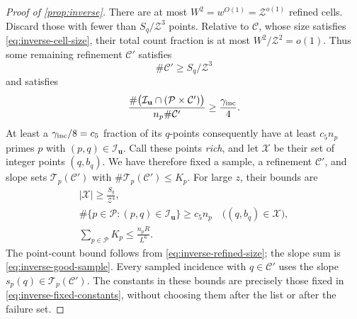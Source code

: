 \begin{proof}[Proof of \cref{prop:inverse}]
There are at most \(W^2=w^{O(1)}=\mathcal Z^{o(1)}\) refined cells.
Discard those with fewer than \(S_q/\mathcal Z^3\) points.
Relative to \(\mathcal C\), whose size satisfies
\eqref{eq:inverse-cell-size}, their total count fraction is at most
\(W^2/\mathcal Z^2=o(1)\).
Thus some remaining refinement \(\mathcal C'\) satisfies
\begin{equation}
 \#\mathcal C'\ge S_q/\mathcal Z^3
 \label{eq:inverse-refined-size}
\end{equation}
and satisfies
\[
 \frac{\#\bigl(\mathcal I_{\mathbf u}\cap
                 (\mathcal P\times\mathcal C')\bigr)}
      {n_p\#\mathcal C'}\ge\frac{\gamma_{\rm inc}}4.
\]
At least a \(\gamma_{\rm inc}/8=c_5\) fraction of its \(q\)-points consequently
have at least \(c_5 n_p\) primes \(p\) with
\((p,q)\in\mathcal I_{\mathbf u}\).
Call these points \emph{rich}, and let \(\mathcal X\) be their set of
integer points \((q,b_q)\). We have therefore fixed a sample, a refinement
\(\mathcal C'\), and slope sets \(\mathcal T_p(\mathcal C')\) with
\(\#\mathcal T_p(\mathcal C')\le K_p\). For large \(z\), their bounds are
\begin{equation}
\begin{gathered}
 |\mathcal X|\ge \frac{S_q}{\mathcal Z^4},\\
 \#\{p\in\mathcal P:(p,q)\in\mathcal I_{\mathbf u}\}\ge c_5n_p
       \quad\bigl((q,b_q)\in\mathcal X\bigr),\\
 \sum_{p\in\mathcal P}K_p\le\frac{n_pR}{L^6}.
\end{gathered}
 \label{eq:inverse-rich-points}
\end{equation}
The point-count bound follows from \eqref{eq:inverse-refined-size};
the slope sum is \eqref{eq:inverse-good-sample}. Every sampled incidence
with \(q\in\mathcal C'\) uses the slope
\(s_p(q)\in\mathcal T_p(\mathcal C')\).
The constants in these bounds are precisely those fixed in
\eqref{eq:inverse-fixed-constants}, without choosing them after the
list or after the failure set.


\end{proof}
